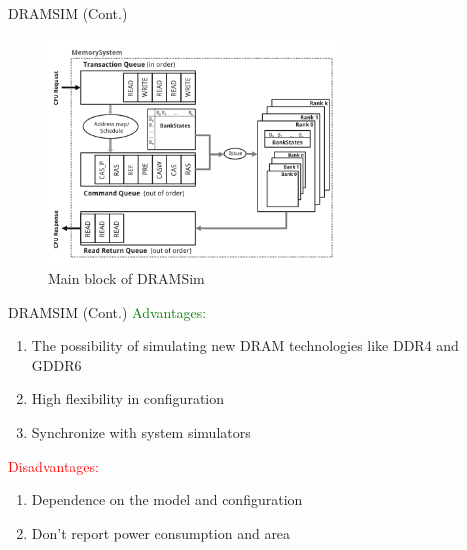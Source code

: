 \documentclass{beamer}
\begin{document}
\begin{frame}{DRAMSIM (Cont.)}
	\begin{figure}
		\centering
		\includegraphics[height=6cm]{images/img11}
		\caption{Main block of DRAMSim}
		\label{fig:Main block of DRAMSim}
	\end{figure}
\end{frame}




\begin{frame}{DRAMSIM (Cont.)}
	\textcolor{green}{Advantages:}
	\begin{enumerate}
		\item The possibility of simulating new DRAM technologies like DDR4 and GDDR6
		\item High flexibility in configuration
		\item Synchronize with system simulators
	\end{enumerate}
	
	\textcolor{red}{Disadvantages:}
	\begin{enumerate}
		\item Dependence on the model and configuration
		\item Don't report power consumption and area
	\end{enumerate}
\end{frame}
\end{document}
